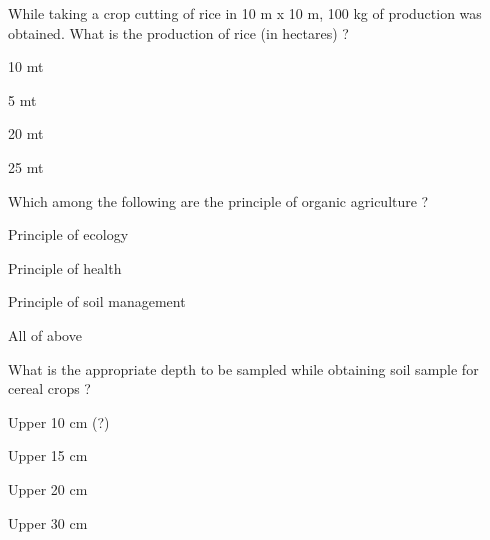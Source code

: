 \begin{questions}
\question While taking a crop cutting of rice in 10 m x 10 m, 100 kg of production was obtained. What is the production of rice (in hectares) ?
\begin{items}
\item* 10 mt
\item 5 mt
\item 20 mt
\item 25 mt
\end{items}

\question Which among the following are the principle of organic agriculture ?
\begin{items}
\item Principle of ecology
\item Principle of health
\item Principle of soil management
\item* All of above
\end{items}

\question What is the appropriate depth to be sampled while obtaining soil sample for cereal crops ?
\begin{items}
\item* Upper 10 cm (?)
\item Upper 15 cm
\item Upper 20 cm
\item Upper 30 cm
\end{items}

\end{questions}
